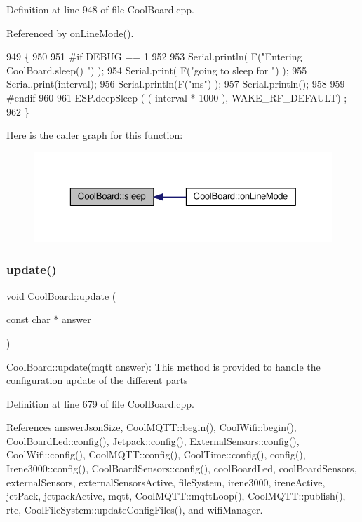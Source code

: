 Definition at line 948 of file Cool\+Board.\+cpp.



Referenced by on\+Line\+Mode().


\begin{DoxyCode}
949 \{
950 
951 \textcolor{preprocessor}{#if DEBUG == 1}
952 
953     Serial.println( F(\textcolor{stringliteral}{"Entering CoolBoard.sleep() "}) );
954     Serial.print( F(\textcolor{stringliteral}{"going to sleep for "}) );
955     Serial.print(interval);
956     Serial.println(F(\textcolor{stringliteral}{"ms"}) );
957     Serial.println();
958 
959 \textcolor{preprocessor}{#endif}
960 
961     ESP.deepSleep ( ( interval * 1000 ), WAKE\_RF\_DEFAULT) ;
962 \}
\end{DoxyCode}
Here is the caller graph for this function\+:
\nopagebreak
\begin{figure}[H]
\begin{center}
\leavevmode
\includegraphics[width=329pt]{classCoolBoard_a5d0c8ff93b615efd676be432de9f164a_icgraph}
\end{center}
\end{figure}
\mbox{\label{classCoolBoard_a8612756d3f73198cdde857a66f0fe690}} 
\subsubsection{\texorpdfstring{update()}{update()}}
{\footnotesize\ttfamily void Cool\+Board\+::update (\begin{DoxyParamCaption}\item[{const char $\ast$}]{answer }\end{DoxyParamCaption})}

Cool\+Board\+::update(mqtt answer)\+: This method is provided to handle the configuration update of the different parts 

Definition at line 679 of file Cool\+Board.\+cpp.



References answer\+Json\+Size, Cool\+M\+Q\+T\+T\+::begin(), Cool\+Wifi\+::begin(), Cool\+Board\+Led\+::config(), Jetpack\+::config(), External\+Sensors\+::config(), Cool\+Wifi\+::config(), Cool\+M\+Q\+T\+T\+::config(), Cool\+Time\+::config(), config(), Irene3000\+::config(), Cool\+Board\+Sensors\+::config(), cool\+Board\+Led, cool\+Board\+Sensors, external\+Sensors, external\+Sensors\+Active, file\+System, irene3000, irene\+Active, jet\+Pack, jetpack\+Active, mqtt, Cool\+M\+Q\+T\+T\+::mqtt\+Loop(), Cool\+M\+Q\+T\+T\+::publish(), rtc, Cool\+File\+System\+::update\+Config\+Files(), and wifi\+Manager.



